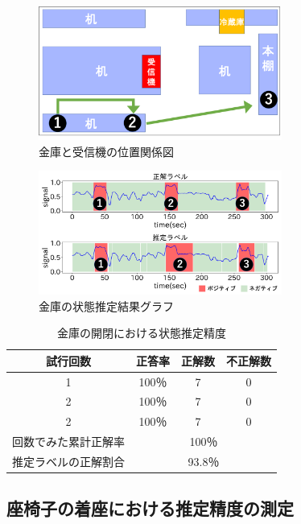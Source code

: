 \documentclass[Japanese]{dicomopapers}
\begin{document}
\begin{figure}[tbh]
    \centering
    \includegraphics[width=8cm]{kinko_position_fig.png}
    \caption{金庫と受信機の位置関係図}
    \label{kinko_position}
\end{figure}

\begin{figure}[tbh]
    \centering
    \includegraphics[width=8cm]{kinko_graph.png}
    \caption{金庫の状態推定結果グラフ}
    \label{kinko_graph}
\end{figure}

\begin{table}[tbh]
    \begin{center}
        \caption{金庫の開閉における状態推定精度}
        \label{kinko_fig}
        \begin{tabular}{|c|c|c|c|} \hline
        試行回数 & 正答率 & 正解数 & 不正解数 \\ \hline
        1 & 100％ & 7 & 0 \\ \hline
        2 & 100％ & 7 & 0 \\ \hline
        2 & 100％ & 7 & 0 \\ \hline \hline
        回数でみた累計正解率 & \multicolumn{3}{c|}{100％} \\ \hline \hline
        推定ラベルの正解割合 & \multicolumn{3}{c|}{93.8％} \\ \hline

        \end{tabular}
    \end{center}
\end{table}



\subsection{座椅子の着座における推定精度の測定}
\end{document}
